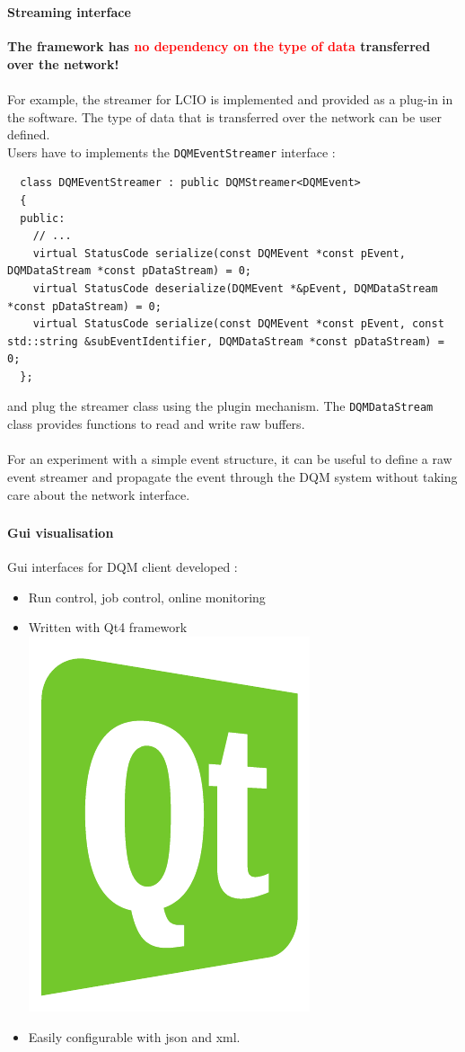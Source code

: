 \documentclass[8pt]{beamer}
\begin{document}
    
    
    
    \begin{frame}[containsverbatim]
    \frametitle{\secname}
    \framesubtitle{Streaming interface}

      \textbf{The framework has \textcolor{red}{no dependency on the type of data} transferred over the network!} \\
      ~ \\
      For example, the streamer for LCIO is implemented and provided as a plug-in in the software. The type of data that is transferred over the network can be user defined. \\
      Users have to implements the \verb|DQMEventStreamer| interface : \\

  \begin{lstlisting}
  class DQMEventStreamer : public DQMStreamer<DQMEvent>
  {
  public:
    // ...
    virtual StatusCode serialize(const DQMEvent *const pEvent, DQMDataStream *const pDataStream) = 0;
    virtual StatusCode deserialize(DQMEvent *&pEvent, DQMDataStream *const pDataStream) = 0;
    virtual StatusCode serialize(const DQMEvent *const pEvent, const std::string &subEventIdentifier, DQMDataStream *const pDataStream) = 0;
  };
  \end{lstlisting}
  
  and plug the streamer class using the plugin mechanism. The \verb|DQMDataStream| class provides functions to read and write raw buffers. \\
  ~ \\
  For an experiment with a simple event structure, it can be useful to define a raw event streamer and propagate the event through the DQM system without taking care about the network interface. \\
    \end{frame}
  
  
  \begin{frame}
    \frametitle{\secname}
    \framesubtitle{Gui visualisation}
        
	  Gui interfaces for DQM client developed :
            
      \begin{itemize}
        \item Run control, job control, online monitoring
        \item Written with Qt4 framework     \includegraphics[width=.03\textwidth]{logo/Qt_CMYK_color}
        \item Easily configurable with json and xml.
      \end{itemize}
    
      \end{frame} 
      
\end{document}
